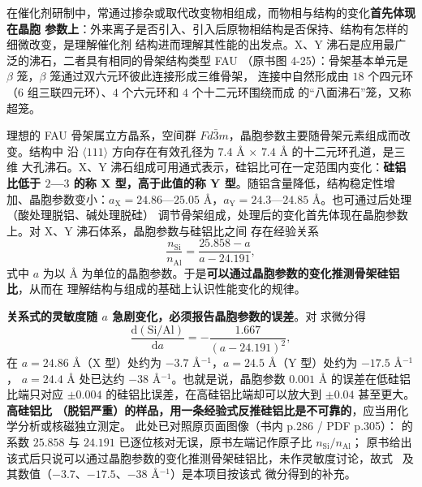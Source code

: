 \begin{principle}
在催化剂研制中，常通过掺杂或取代改变物相组成，而物相与结构的变化\textbf{首先体现在晶胞
参数上}：外来离子是否引入、引入后原物相结构是否保持、结构有怎样的细微改变，是理解催化剂
结构进而理解其性能的出发点。X、Y 沸石是应用最广泛的沸石，二者具有相同的骨架结构类型 FAU
（原书图 4-25）：骨架基本单元是 $\beta$ 笼，$\beta$ 笼通过双六元环彼此连接形成三维骨架，
连接中自然形成由 $18$ 个四元环（$6$ 组三联四元环）、$4$ 个六元环和 $4$ 个十二元环围绕而成
的``八面沸石''笼，又称超笼。

理想的 FAU 骨架属立方晶系，空间群 $Fd\bar{3}m$，晶胞参数主要随骨架元素组成而改变。结构中
沿 $\langle111\rangle$ 方向存在有效孔径为 $7.4$ Å $\times$ $7.4$ Å 的十二元环孔道，是三维
大孔沸石。X、Y 沸石组成可用通式表示，硅铝比可在一定范围内变化：\textbf{硅铝比低于 $2$—$3$
的称 X 型，高于此值的称 Y 型}。随铝含量降低，结构稳定性增加、晶胞参数变小：$a_{\mathrm{X}}
=24.86$—$25.05$ Å，$a_{\mathrm{Y}}=24.3$—$24.85$ Å。也可通过后处理（酸处理脱铝、碱处理脱硅）
调节骨架组成，处理后的变化首先体现在晶胞参数上。对 X、Y 沸石体系，晶胞参数与硅铝比之间
存在经验关系
\begin{equation}
\frac{n_{\mathrm{Si}}}{n_{\mathrm{Al}}}=\frac{25.858-a}{a-24.191},
\label{eq:ch04c-sial}
\end{equation}
式中 $a$ 为以 Å 为单位的晶胞参数。于是\textbf{可以通过晶胞参数的变化推测骨架硅铝比}，从而在
理解结构与组成的基础上认识性能变化的规律。
\end{principle}

\begin{pitfall}
\textbf{关系式的灵敏度随 $a$ 急剧变化，必须报告晶胞参数的误差}。对
求微分得
\begin{equation}
\frac{\mathrm{d}(\mathrm{Si}/\mathrm{Al})}{\mathrm{d}a}
=-\frac{1.667}{\left(a-24.191\right)^{2}} ,
\label{eq:ch04c-sialsens}
\end{equation}
在 $a=24.86$ Å（X 型）处约为 $-3.7$ Å$^{-1}$，$a=24.5$ Å（Y 型）处约为 $-17.5$ Å$^{-1}$，
$a=24.4$ Å 处已达约 $-38$ Å$^{-1}$。也就是说，晶胞参数 $0.001$ Å 的误差在低硅铝比端只对应
$\pm0.004$ 的硅铝比误差，在高硅铝比端却可以放大到 $\pm0.04$ 甚至更大。\textbf{高硅铝比
（脱铝严重）的样品，用一条经验式反推硅铝比是不可靠的}，应当用化学分析或核磁独立测定。
此处已对照原页面图像（书内 p.286 / PDF p.305）： 的系数
$25.858$ 与 $24.191$ 已逐位核对无误，原书左端记作原子比 $n_{\mathrm{Si}}/n_{\mathrm{Al}}$；
原书给出该式后只说可以通过晶胞参数的变化推测骨架硅铝比，未作灵敏度讨论，故式~
 及其数值（$-3.7$、$-17.5$、$-38$ Å$^{-1}$）是本项目按该式
微分得到的补充。
\end{pitfall}


